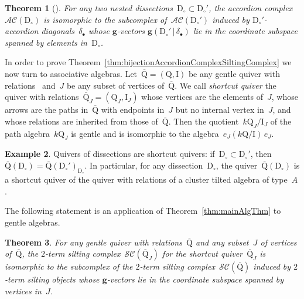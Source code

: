 \documentclass{compositio}
\newtheorem{theorem}{Theorem}%
\theoremstyle{definition}
\newtheorem{example}[theorem]{Example}
\renewcommand{\b}[1]{\mathbf{#1}} %
\newcommand{\darkblue}{\color{darkblue}} %
\newcommand{\defn}[1]{\textsl{\darkblue #1}} %
\newcommand{\dissection}{\mathrm{D}} %
\newcommand{\accordionComplex}{\mathcal{AC}} %
\newcommand{\gvector}[2]{\mathbf{g}(#1 \,|\, #2)} %
\newcommand{\quiver}{\mathrm{Q}} %
\newcommand{\relations}{\mathrm{I}} %
\newcommand{\siltingComplex}{\mathcal{SC}}
\begin{document}
\begin{theorem}[{\cite[Sect.~4.2]{MannevillePilaud-accordion}}]
\label{thm:contractDiagonals}
For any two nested dissections~$\dissection_\circ \subset \dissection_\circ'$, the accordion complex~$\accordionComplex(\dissection_\circ)$ is isomorphic to the subcomplex of~$\accordionComplex(\dissection_\circ')$ induced by $\dissection_\circ'$-accordion diagonals~$\delta_\bullet$ whose $\b{g}$-vectors $\gvector{\dissection_\circ'}{\delta_\bullet}$ lie in the coordinate subspace spanned by elements in~$\dissection_\circ$.
\end{theorem}

In order to prove Theorem~\ref{thm:bijectionAccordionComplexSiltingComplex} we now turn to associative algebras.
Let~$\overline{\quiver} = (\quiver, \relations)$ be any gentle quiver with relations~\cite{ButlerRingel} and~$J$ be any subset of vertices of~$\overline{\quiver}$.
We call \defn{shortcut quiver} the quiver with relations~$\overline{\quiver}_J = (\quiver_J, \relations_J)$ whose vertices are the elements of~$J$, whose arrows are the paths in~$\overline{\quiver}$ with endpoints in~$J$ but no internal vertex in~$J$, and whose relations are inherited from those of~$\overline{\quiver}$.
Then the quotient~$k\quiver_J/\relations_J$ of the path algebra~$k\quiver_J$ is gentle and is isomorphic to the algebra~$e_J (k\quiver/\relations) \, e_J$.

\begin{example}
Quivers of dissections are shortcut quivers: if~$\dissection_\circ \subset \dissection_\circ'$, then~${\overline{\quiver}(\dissection_\circ) = \overline{\quiver}(\dissection_\circ')_{\dissection_\circ}}$.
In particular, for any dissection~$\dissection_\circ$, the quiver~$\overline{\quiver}(\dissection_\circ)$ is a shortcut quiver of the quiver with relations of a cluster tilted algebra of type~$A$.
\end{example}

\enlargethispage{.1cm}
The following statement is an application of Theorem~\ref{thm:mainAlgThm} to gentle algebras.

\begin{theorem}
\label{thm:contractVertices}
For any gentle quiver with relations~$\overline{\quiver}$ and any subset~$J$ of vertices of~$\overline{\quiver}$, the \mbox{$2$-term} silting complex~$\siltingComplex(\overline{\quiver}_J)$ for the shortcut quiver~$\overline{\quiver}_J$ is isomorphic to the subcomplex of the $2$-term silting complex~$\siltingComplex(\overline{\quiver})$ induced by $2$-term silting objects whose $\b{g}$-vectors lie in the coordinate subspace spanned by vertices in~$J$.
\end{theorem}
\end{document}
